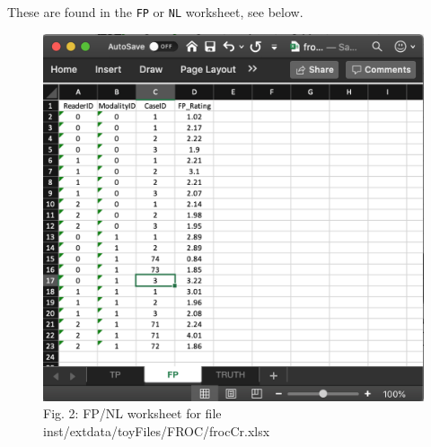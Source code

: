\documentclass[
]{book}
\begin{document}
These are found in the \texttt{FP} or \texttt{NL} worksheet, see below.

\begin{figure}

{\centering \includegraphics[width=0.5\linewidth,height=0.2\textheight]{images/frocCrNL} 

}

\caption{Fig. 2: FP/NL worksheet for file inst/extdata/toyFiles/FROC/frocCr.xlsx}\label{fig:frocCrNL}
\end{figure}
\end{document}
